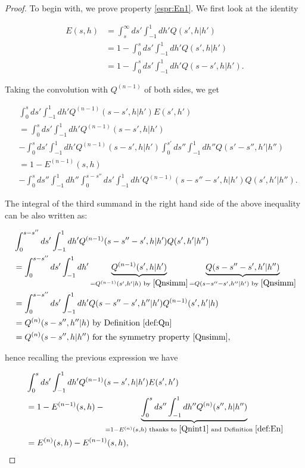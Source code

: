 \documentclass[a4paper,10pt,reqno]{amsart}
\numberwithin{equation}{subsection}
\numberwithin{figure}{subsection}
\begin{document}
\begin{proof}
To begin with, we prove property \eqref{espr:En1}. We first look at the identity

\begin{align*}
E(s,h)&=\int_s^{\infty}ds'\int_{-1}^1dh'Q(s',h|h')
\\
&=1-\int_0^sds'\int_{-1}^1dh'Q(s',h|h')
\\
&=1-\int_0^sds'\int_{-1}^1dh'Q(s-s',h|h').
\end{align*}

Taking the convolution with $Q^{(n-1)}$ of both sides, we get

\begin{align*}
&\int_0^sds'\int_{-1}^1dh'Q^{(n-1)}(s-s',h|h')E(s',h')
\\
&=\int_0^sds'\int_{-1}^1dh'Q^{(n-1)}(s-s',h|h')
\\
&-\int_0^sds'\int_{-1}^1dh'Q^{(n-1)}(s-s',h|h')\int_0^{s'}ds''\int_{-1}^1dh''Q(s'-s'',h'|h'')
\\
&=1-E^{(n-1)}(s,h)
\\
&-\int_0^sds''\int_{-1}^1dh''\int_0^{s-s''}ds'\int_{-1}^1dh'Q^{(n-1)}(s-s''-s',h|h')Q(s',h'|h'').
\end{align*}

The integral of the third summand in the right hand side of the above inequality can be also written as:

\begin{align*}
&\int_0^{s-s''}ds'\int_{-1}^1dh'Q^{(n-1)}(s-s''-s',h|h')Q(s',h'|h'')
\\
&=\int_0^{s-s''}ds'\int_{-1}^1dh'\underbrace{Q^{(n-1)}(s',h|h')}_{=Q^{(n-1)}(s',h'|h)\textrm{ by }\eqref{Qnsimm}}\underbrace{Q(s-s''-s',h'|h'')}_{=Q(s-s''-s',h''|h')\textrm{ by }\eqref{Qnsimm}}
\\
&=\int_0^{s-s''}ds'\int_{-1}^1dh'Q(s-s''-s',h''|h')Q^{(n-1)}(s',h'|h)
\\
&=Q^{(n)}(s-s'',h''|h)\textrm{ by Definition }\ref{def:Qn}
\\
&=Q^{(n)}(s-s'',h|h'')\textrm{ for the symmetry property }\eqref{Qnsimm},
\end{align*}

hence recalling the previous expression we have

\begin{align*}
&\int_0^sds'\int_{-1}^1dh'Q^{(n-1)}(s-s',h|h')E(s',h')
\\
&=1-E^{(n-1)}(s,h)-\underbrace{\int_0^sds''\int_{-1}^1dh''Q^{(n)}(s'',h|h'')}_{=1-E^{(n)}(s,h)\textrm{ thanks to }\eqref{Qnint1}\textrm{ and Definition }\ref{def:En}}
\\
&=E^{(n)}(s,h)-E^{(n-1)}(s,h),
\end{align*}


\end{proof}
\end{document}
